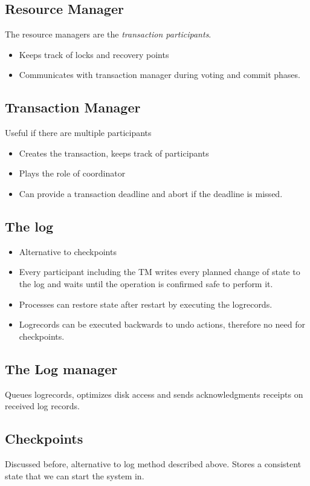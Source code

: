 \subsection{Resource Manager}
The resource managers are the \textit{transaction participants}. 
\begin{itemize}
\item Keeps track of locks and recovery points
\item Communicates with transaction manager during voting and commit phases.
\end{itemize}

\subsection{Transaction Manager}
Useful if there are multiple participants
\begin{itemize}
\item Creates the transaction, keeps track of participants
\item Plays the role of coordinator
\item Can provide a transaction deadline and abort if the deadline is missed.
\end{itemize}

\subsection{The log}
\begin{itemize}
\item Alternative to checkpoints
\item Every participant including the TM writes every planned change of state to the log and waits until the operation is confirmed safe to perform it. 
\item Processes can restore state after restart by executing the logrecords.
\item Logrecords can be executed backwards to undo actions, therefore no need for checkpoints.
\end{itemize}

\subsection{The Log manager}
Queues logrecords, optimizes disk access and sends acknowledgments receipts on received log records.

\subsection{Checkpoints}
Discussed before, alternative to log method described above. Stores a consistent state that we can start the system in.

